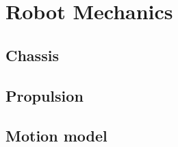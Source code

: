 \documentclass[Main]{subfiles}
\begin{document}
\section{Robot Mechanics} %
	\label{sec:robot_mechanics}

	\subsection{Chassis} %
		\label{sub:chassis}
		

	\subsection{Propulsion} %
		\label{sub:propulsion}
		

	\subsection{Motion model} %
		\label{sub:motion_model}
		

\end{document}
